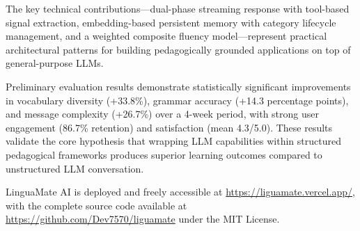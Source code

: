 \documentclass[conference]{IEEEtran}
\begin{document}
The key technical contributions---dual-phase streaming response with tool-based signal extraction, embedding-based persistent memory with category lifecycle management, and a weighted composite fluency model---represent practical architectural patterns for building pedagogically grounded applications on top of general-purpose LLMs.

Preliminary evaluation results demonstrate statistically significant improvements in vocabulary diversity (+33.8\%), grammar accuracy (+14.3 percentage points), and message complexity (+26.7\%) over a 4-week period, with strong user engagement (86.7\% retention) and satisfaction (mean 4.3/5.0). These results validate the core hypothesis that wrapping LLM capabilities within structured pedagogical frameworks produces superior learning outcomes compared to unstructured LLM conversation.

LinguaMate AI is deployed and freely accessible at \url{https://liguamate.vercel.app/}, with the complete source code available at \url{https://github.com/Dev7570/liguamate} under the MIT License.
\end{document}
